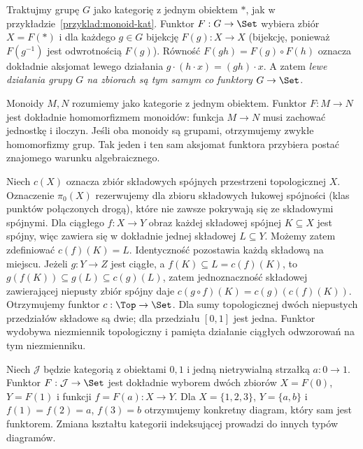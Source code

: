 \begin{przyklad}\label{przyklad:dzialanie-funktor}
Traktujmy grupę $G$ jako kategorię z jednym obiektem $*$, jak w przykładzie~\ref{przyklad:monoid-kat}. Funktor $F:G\to\Set$ wybiera zbiór $X=F(*)$ i dla każdego $g\in G$ bijekcję $F(g):X\to X$ (bijekcję, ponieważ $F(g^{-1})$ jest odwrotnością $F(g)$). Równość $F(gh)=F(g)\circ F(h)$ oznacza dokładnie aksjomat lewego działania $g\cdot(h\cdot x)=(gh)\cdot x$. A zatem \emph{lewe działania grupy $G$ na zbiorach są tym samym co funktory $G\to\Set$}.
\end{przyklad}

\begin{przyklad}
Monoidy $M,N$ rozumiemy jako kategorie z jednym obiektem. Funktor $F:M\to N$ jest dokładnie homomorfizmem monoidów: funkcja $M\to N$ musi zachować jednostkę i iloczyn. Jeśli oba monoidy są grupami, otrzymujemy zwykłe homomorfizmy grup. Tak jeden i ten sam aksjomat funktora przybiera postać znajomego warunku algebraicznego.
\end{przyklad}


\begin{przyklad}
Niech $c(X)$ oznacza zbiór składowych spójnych przestrzeni topologicznej $X$. Oznaczenie $\pi_0(X)$ rezerwujemy dla zbioru składowych łukowej spójności (klas punktów połączonych drogą), które nie zawsze pokrywają się ze składowymi spójnymi. Dla ciągłego $f:X\to Y$ obraz każdej składowej spójnej $K\subseteq X$ jest spójny, więc zawiera się w dokładnie jednej składowej $L\subseteq Y$. Możemy zatem zdefiniować $c(f)(K)=L$. Identyczność pozostawia każdą składową na miejscu. Jeżeli $g:Y\to Z$ jest ciągłe, a $f(K)\subseteq L=c(f)(K)$, to $g(f(K))\subseteq g(L)\subseteq c(g)(L)$, zatem jednoznaczność składowej zawierającej niepusty zbiór spójny daje $c(g\circ f)(K)=c(g)(c(f)(K))$. Otrzymujemy funktor $c:\Top\to\Set$. Dla sumy topologicznej dwóch niepustych przedziałów składowe są dwie; dla przedziału $[0,1]$ jest jedna. Funktor wydobywa niezmiennik topologiczny i pamięta działanie ciągłych odwzorowań na tym niezmienniku.
\end{przyklad}

\begin{przyklad}
Niech $\mathcal J$ będzie kategorią z obiektami $0,1$ i jedną nietrywialną strzałką $a:0\to1$. Funktor $F:\mathcal J\to\Set$ jest dokładnie wyborem dwóch zbiorów $X=F(0)$, $Y=F(1)$ i funkcji $f=F(a):X\to Y$. Dla $X=\{1,2,3\}$, $Y=\{a,b\}$ i $f(1)=f(2)=a$, $f(3)=b$ otrzymujemy konkretny diagram, który sam jest funktorem. Zmiana kształtu kategorii indeksującej prowadzi do innych typów diagramów.
\end{przyklad}


